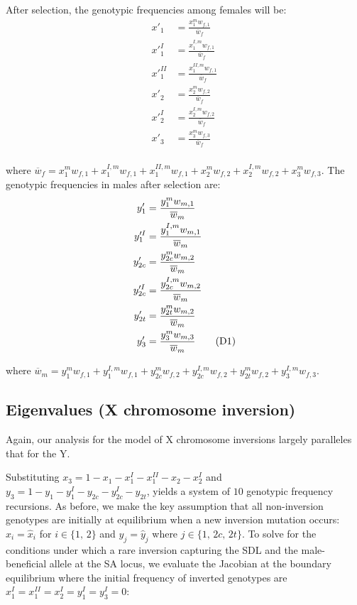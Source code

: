 \documentclass{article}
\newcommand\numberthis{\addtocounter{equation}{1}\tag{\theequation}}
\begin{document}
\noindent After selection, the genotypic frequencies among females will be:
\begin{align*}
	x'_{1}     &= \frac{x^m_1 w_{f,1}     }{\overline{w}_{f}} \\
	x'^{I}_{1}  &= \frac{x^{I,m}_1 w_{f,1} }{\overline{w}_{f}} \\
	x'^{II}_{1} &= \frac{x^{II,m}_1 w_{f,1}}{\overline{w}_{f}} \\
	x'_{2}      &= \frac{x^m_2 w_{f,2}     }{\overline{w}_{f}} \\
	x'^{I}_{2}  &= \frac{x^{I,m}_2 w_{f,2} }{\overline{w}_{f}} \\
	x'_{3}      &= \frac{x^m_3 w_{f,3}     }{\overline{w}_{f}} \\
\end{align*}
    
\noindent where $\overline{w}_{f} = x^m_1 w_{f,1} + x^{I,m}_1 w_{f,1} + x^{II,m}_1 w_{f,1} + x^m_2 w_{f,2} + x^{I,m}_2 w_{f,2} + x^m_3 w_{f,3} $. The genotypic frequencies in males after selection are:
\begin{align*}
	y'_{1}       &= \frac{y^m_1 w_{m,1}       }{\overline{w}_{m}} \\
	y'^I_{1}     &= \frac{y^{I,m}_{1} w_{m,1} }{\overline{w}_{m}} \\
	y'_{2c}      &= \frac{y^{m}_{2c} w_{m,2}  }{\overline{w}_{m}}  \\
	y'^I_{2c}    &= \frac{y^{I,m}_{2c} w_{m,2}}{\overline{w}_{m}} \\
	y'_{2t}      &= \frac{y^m_{2t} w_{m,2}    }{\overline{w}_{m}} \\
	y'_{3}       &= \frac{y^{m}_3 w_{m,3}   }{\overline{w}_{m}} \numberthis
\end{align*}
  
\noindent where $\overline{w}_{m} = y^m_1 w_{f,1} + y^{I,m}_{1} w_{f,1} + y^{m}_{2c} w_{f,2} + y^{I,m}_{2c} w_{f,2} + y^m_{2t} w_{f,2} + y^{I,m}_3 w_{f,3} $.



\subsection{Eigenvalues (X chromosome inversion)}

Again, our analysis for the model of X chromosome inversions largely paralleles that for the Y.

Substituting $x_3 = 1 - x_{1} - x^I_{1} - x^{II}_{1} - x_{2} - x^I_{2}$ and $y_3 = 1 - y_1 - y^I_1 - y_{2c} - y^I_{2c} - y_{2t}$, yields a system of $10$ genotypic frequency recursions. As before, we make the key assumption that all non-inversion genotypes are initially at equilibrium when a new inversion mutation occurs: $x_i = \hat{x}_i$ for $i \in \{1,\,2 \}$ and $y_j = \hat{y}_j$ where $j \in \{ 1,\,2c,\,2t \}$. To solve for the conditions under which a rare inversion capturing the SDL and the male-beneficial allele at the SA locus, we evaluate the Jacobian at the boundary equilibrium where the initial frequency of inverted genotypes are $x^{I}_{1} = x^{II}_{1} = x^I_2 = y^I_1 = y^I_3 = 0$:
\end{document}
